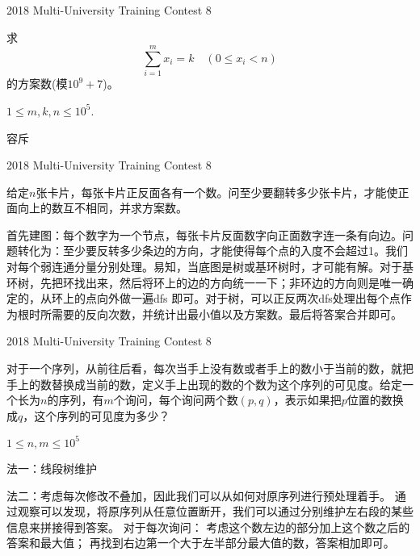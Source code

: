 \documentclass[11pt,serif]{beamer}
\begin{document}
	\begin{frame}{2018 Multi-University Training Contest 8}
		
		\begin{problem}
			求
			$$
				\sum_{i = 1}^{m}x_i = k \quad (0 \leq x_i < n)
			$$
			的方案数(模$10^9+7$)。
			
			$1 \leq m, k, n \leq 10^5$.
		\end{problem}
	
		\pause
		
		\begin{solution}
			容斥
		\end{solution}
	
	\end{frame}

	\begin{frame}{2018 Multi-University Training Contest 8}
		\begin{problem}
			给定$n$张卡片，每张卡片正反面各有一个数。问至少要翻转多少张卡片，才能使正面向上的数互不相同，并求方案数。
		\end{problem}
		
		\pause 
	
		\begin{solution}
			首先建图：每个数字为一个节点，每张卡片反面数字向正面数字连一条有向边。问题转化为：至少要反转多少条边的方向，才能使得每个点的入度不会超过1。我们对每个弱连通分量分别处理。易知，当底图是树或基环树时，才可能有解。对于基环树，先把环找出来，然后将环上的边的方向统一一下；非环边的方向则是唯一确定的，从环上的点向外做一遍dfs 即可。对于树，可以正反两次dfs处理出每个点作为根时所需要的反向次数，并统计出最小值以及方案数。最后将答案合并即可。
		\end{solution}
	\end{frame} 

	\begin{frame}{2018 Multi-University Training Contest 8} 
		\begin{problem}
			对于一个序列，从前往后看，每次当手上没有数或者手上的数小于当前的数，就把手上的数替换成当前的数，定义手上出现的数的个数为这个序列的可见度。给定一个长为$n$的序列，有$m$个询问，每个询问两个数$(p,q)$，表示如果把$p$位置的数换成$q$，这个序列的可见度为多少？
			
			$1 \leq n, m \leq 10^5$
		\end{problem}
		\pause
		\begin{solution}
			法一：线段树维护
			
			\pause 
			
			法二：考虑每次修改不叠加，因此我们可以从如何对原序列进行预处理着手。
			通过观察可以发现，将原序列从任意位置断开，我们可以通过分别维护左右段的某些信息来拼接得到答案。	
			对于每次询问：
			考虑这个数左边的部分加上这个数之后的答案和最大值；
			再找到右边第一个大于左半部分最大值的数，答案相加即可。
		\end{solution}
	\end{frame} 
\end{document}
